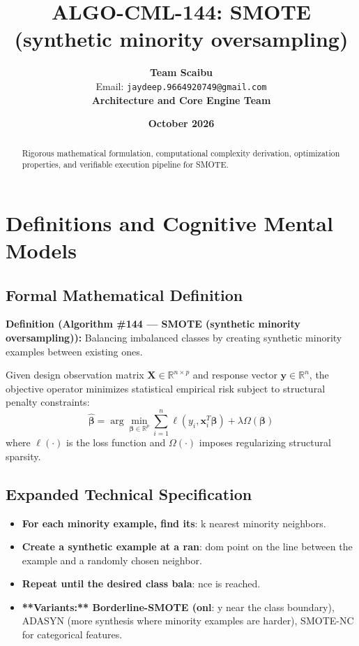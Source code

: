 \documentclass[11pt,a4paper]{article}
\title{\textbf{ALGO-CML-144: SMOTE (synthetic minority oversampling)}}
\author{\textbf{Team Scaibu} \\ \small Email: \texttt{jaydeep.9664920749@gmail.com} \\ \small \textbf{Architecture and Core Engine Team}}
\date{\textbf{October 2026}}
\theoremstyle{definition}
\begin{document}
\maketitle

\begin{abstract}
Rigorous mathematical formulation, computational complexity derivation, optimization properties, and verifiable execution pipeline for SMOTE.
\end{abstract}

\section{Definitions and Cognitive Mental Models}

\subsection{Formal Mathematical Definition}
\textbf{Definition (Algorithm \#144 --- SMOTE (synthetic minority oversampling)):}
Balancing imbalanced classes by creating synthetic minority examples between existing ones.

Given design observation matrix $\mathbf{X} \in \mathbb{R}^{n \times p}$ and response vector $\mathbf{y} \in \mathbb{R}^n$, the objective operator minimizes statistical empirical risk subject to structural penalty constraints:
\begin{equation}
\hat{\boldsymbol{\beta}} = \arg\min_{\boldsymbol{\beta} \in \mathbb{R}^p} \sum_{i=1}^n \ell(y_i, \mathbf{x}_i^T \boldsymbol{\beta}) + \lambda \Omega(\boldsymbol{\beta})
\end{equation}
where $\ell(\cdot)$ is the loss function and $\Omega(\cdot)$ imposes regularizing structural sparsity.

\subsection{Expanded Technical Specification}
\begin{itemize}
\item \textbf{For each minority example, find its}:  k nearest minority neighbors.
\item \textbf{Create a synthetic example at a ran}: dom point on the line between the example and a randomly chosen neighbor.
\item \textbf{Repeat until the desired class bala}: nce is reached.
\item \textbf{**Variants:** Borderline-SMOTE (onl}: y near the class boundary), ADASYN (more synthesis where minority examples are harder), SMOTE-NC for categorical features.
\end{itemize}
\end{document}
